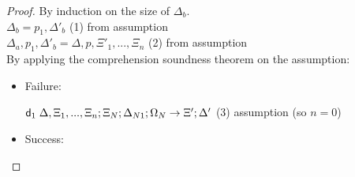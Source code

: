 \begin{proof}
   By induction on the size of $\Delta_b$.\\

   $\Delta_b = p_1, \Delta'_b$ \hfill (1) from assumption \\
   $\Delta_a, p_1, \Delta'_b = \Delta, p, \Xi'_1, ..., \Xi_n$ \hfill (2) from assumption \\
   By applying the comprehension soundness theorem on the assumption:\\
      
   \begin{itemize}
      \item Failure:
         
      $\mathsf{d}_1 \; \Delta, \Xi_1, ..., \Xi_n; \Xi_N; \Delta_{N1}; \Omega_N \rightarrow \Xi'; \Delta'$ \hfill (3) assumption (so $n = 0$)\\
         
      \item Success:
         

\end{itemize}
\end{proof}
